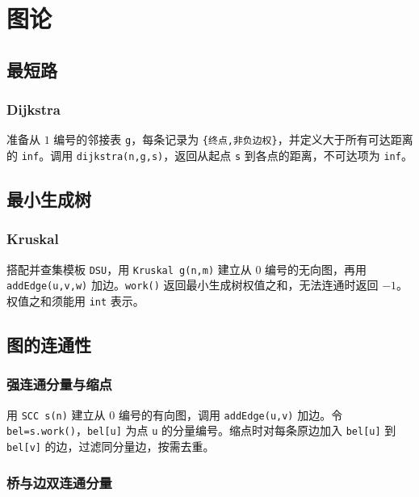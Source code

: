 \chapter{图论}

\section{最短路}

\subsection{Dijkstra}

准备从 $1$ 编号的邻接表 \texttt{g}，每条记录为 \texttt{\{终点,非负边权\}}，并定义大于所有可达距离的 \texttt{inf}。调用 \texttt{dijkstra(n,g,s)}，返回从起点 \texttt{s} 到各点的距离，不可达项为 \texttt{inf}。


\section{最小生成树}

\subsection{Kruskal}

搭配并查集模板 \texttt{DSU}，用 \texttt{Kruskal g(n,m)} 建立从 $0$ 编号的无向图，再用 \texttt{addEdge(u,v,w)} 加边。\texttt{work()} 返回最小生成树权值之和，无法连通时返回 $-1$。权值之和须能用 \texttt{int} 表示。


\section{图的连通性}

\subsection{强连通分量与缩点}

用 \texttt{SCC s(n)} 建立从 $0$ 编号的有向图，调用 \texttt{addEdge(u,v)} 加边。令 \texttt{bel=s.work()}，\texttt{bel[u]} 为点 \texttt{u} 的分量编号。缩点时对每条原边加入 \texttt{bel[u]} 到 \texttt{bel[v]} 的边，过滤同分量边，按需去重。


\subsection{桥与边双连通分量}

